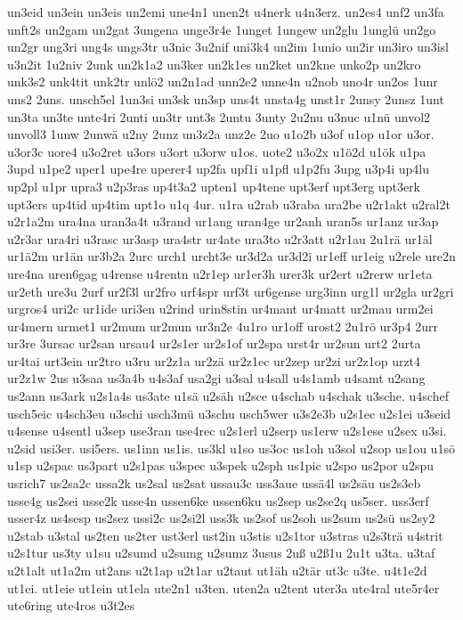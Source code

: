 {un3eid
un3ein
un3eis
un2emi
une4n1
unen2t
u4nerk
u4n3erz.
un2es4
unf2
un3fa
unft2s
un2gam
un2gat
3ungena
unge3r4e
1unget
1ungew
un2glu
1unglü
un2go
un2gr
ung3ri
ung4s
ungs3tr
u3nic
3u2nif
uni3k4
un2im
1unio
un2ir
un3iro
un3isl
u3n2it
1u2niv
2unk
un2k1a2
un3ker
un2k1es
un2ket
un2kne
unko2p
un2kro
unk3s2
unk4tit
unk2tr
unlö2
un2n1ad
unn2e2
unne4n
u2nob
uno4r
un2os
1unr
uns2
2uns.
unsch5el
1un3si
un3sk
un3sp
uns4t
unsta4g
unst1r
2unsy
2unsz
1unt
un3ta
un3te
unte4ri
2unti
un3tr
unt3s
2untu
3unty
2u2nu
u3nuc
u1nü
unvol2
unvoll3
1unw
2unwä
u2ny
2unz
un3z2a
unz2e
2uo
u1o2b
u3of
u1op
u1or
u3or.
u3or3c
uore4
u3o2ret
u3ors
u3ort
u3orw
u1os.
uote2
u3o2x
u1ö2d
u1ök
u1pa
3upd
u1pe2
uper1
upe4re
uperer4
up2fa
upf1i
u1pfl
u1p2fu
3upg
u3p4i
up4lu
up2pl
u1pr
upra3
u2p3ras
up4t3a2
upten1
up4tene
upt3erf
upt3erg
upt3erk
upt3ers
up4tid
up4tim
upt1o
u1q
4ur.
u1ra
u2rab
u3raba
ura2be
u2r1akt
u2ral2t
u2r1a2m
ura4na
uran3a4t
u3rand
ur1ang
uran4ge
ur2anh
uran5s
ur1anz
ur3ap
u2r3ar
ura4ri
u3rasc
ur3asp
ura4str
ur4ate
ura3to
u2r3att
u2r1au
2u1rä
ur1äl
ur1ä2m
ur1än
ur3b2a
2urc
urch1
urcht3e
ur3d2a
ur3d2i
ur1eff
ur1eig
u2rele
ure2n
ure4na
uren6gag
u4rense
u4rentn
u2r1ep
ur1er3h
urer3k
ur2ert
u2rerw
ur1eta
ur2eth
ure3u
2urf
ur2f3l
ur2fro
urf4spr
urf3t
ur6gense
urg3inn
urg1l
ur2gla
ur2gri
urgros4
uri2c
ur1ide
uri3en
u2rind
urin8stin
ur4mant
ur4matt
ur2mau
urm2ei
ur4mern
urmet1
ur2mum
ur2mun
ur3n2e
4u1ro
ur1off
urost2
2u1rö
ur3p4
2urr
ur3re
3ursac
ur2san
ursau4
ur2s1er
ur2s1of
ur2spa
urst4r
ur2sun
urt2
2urta
ur4tai
urt3ein
ur2tro
u3ru
ur2z1a
ur2zä
ur2z1ec
ur2zep
ur2zi
ur2z1op
urzt4
ur2z1w
2us
u3saa
us3a4b
u4s3af
usa2gi
u3sal
u4sall
u4s1amb
u4samt
u2sang
us2ann
us3ark
u2s1a4s
us3ate
u1sä
u2säh
u2sce
u4schab
u4schak
u3sche.
u4schef
usch5eic
u4sch3eu
u3schi
usch3mü
u3schu
usch5wer
u3s2e3b
u2s1ec
u2s1ei
u3seid
u4sense
u4sentl
u3sep
use3ran
use4rec
u2s1erl
u2serp
us1erw
u2s1ese
u2sex
u3si.
u2sid
usi3er.
usi5ers.
us1inn
us1is.
us3kl
u1so
us3oc
us1oh
u3sol
u2sop
us1ou
u1sö
u1sp
u2spac
us3part
u2s1pas
u3spec
u3spek
u2sph
us1pic
u2spo
us2por
u2spu
usrich7
us2sa2c
ussa2k
us2sal
us2sat
ussau3c
uss3aue
ussä4l
us2säu
us2s3eb
usse4g
us2sei
usse2k
usse4n
ussen6ke
ussen6ku
us2sep
us2se2q
us5ser.
uss3erf
usser4z
us4sesp
us2sez
ussi2c
us2si2l
uss3k
us2sof
us2soh
us2sum
us2sü
us2sy2
u2stab
u3stal
us2ten
us2ter
ust3erl
ust2in
u3stis
u2s1tor
u3stras
u2s3trä
u4strit
u2s1tur
us3ty
u1su
u2sumd
u2sumg
u2sumz
3usus
2uß
u2ß1u
2u1t
u3ta.
u3taf
u2t1alt
ut1a2m
ut2ans
u2t1ap
u2t1ar
u2taut
ut1äh
u2tär
ut3c
u3te.
u4t1e2d
ut1ei.
ut1eie
ut1ein
ut1ela
ute2n1
u3ten.
uten2a
u2tent
uter3a
ute4ral
ute5r4er
ute6ring
ute4ros
u3t2es
}
